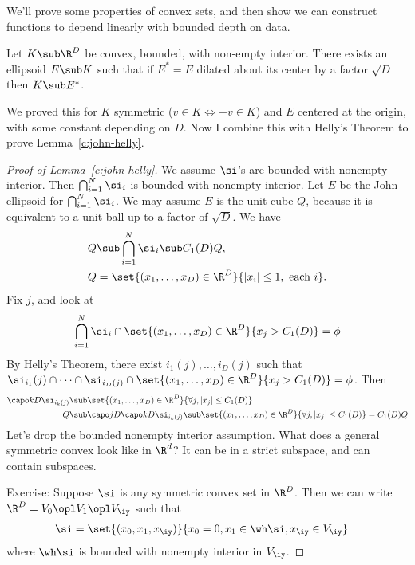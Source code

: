 
We'll prove some properties of convex sets, and then show we can construct functions to depend linearly with bounded depth on data.

\begin{thm}
Let $K\sub \R^D$ be convex, bounded, with non-empty interior. There exists an ellipsoid $E\sub K$ such that if $E^*=E$ dilated about its center by a factor $\sqrt D$ then $K\sub E^*$.
\end{thm}
We proved this for $K$ symmetric ($v\in K\iff -v\in K$) and $E$ centered at the origin, with some constant depending on $D$. Now I combine this with Helly's Theorem to prove Lemma~\ref{c:john-helly}.

\begin{proof}[Proof of Lemma~\ref{c:john-helly}]
We assume $\si$'s are bounded with nonempty interior. Then $\bigcap_{i=1}^N\si_i$ is bounded with nonempty interior. Let $E$ be the John ellipsoid for $\bigcap_{i=1}^N\si_i$. We may assume $E$ is the unit cube $Q$, because it is equivalent to a unit ball up to a factor of $\sqrt D$.
We have
\begin{align}
Q&\sub \bigcap_{i=1}^N \si_i \sub C_1(D)Q,\\
Q&= \set{(x_1,\ldots, x_D)\in \R^D}{|x_i|\le 1,\text{ each }i}.
\end{align}
Fix $j$, and look at 
\begin{align}
\bigcap_{i=1}^N\si_i\cap  \set{(x_1,\ldots, x_D)\in \R^D}{x_j>C_1(D)} = \phi
\end{align}
By Helly's Theorem, there exist $i_1(j),\ldots, i_D(j)$ such that $\si_{i_1}(j)\cap \cdots \cap \si_{i_D(j)}\cap  \set{(x_1,\ldots, x_D)\in \R^D}{x_j>C_1(D)} =\phi$. Then
\begin{align}
\capo kD \si_{i_k(j)}
&\sub   \set{(x_1,\ldots, x_D)\in \R^D}{\forall j,|x_j|\le C_1(D)} \\
Q&\sub \capo jD \capo kD \si_{i_k(j)}
\sub   \set{(x_1,\ldots, x_D)\in \R^D}{\forall j,|x_j|\le C_1(D)} =C_1(D)Q 
\end{align}
Let's drop the bounded nonempty interior assumption. What does a general symmetric convex look like in $\R^d$? It can be in a strict subspace, and can contain subspaces.

Exercise: Suppose $\si$ is any symmetric convex set in $\R^D$. Then we can write $\R^D=V_0\opl V_1\opl V_\iy$ such that 
\begin{align}
\si &= \set{(x_0,x_1,x_\iy)}{x_0=0, x_1 \in \wh \si, x_\iy\in V_\iy}
\end{align}
where $\wh \si$ is bounded with nonempty interior in $V_\iy$. 


\end{proof}
